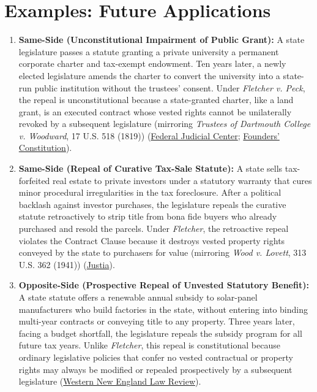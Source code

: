 \documentclass[12pt]{article}
\begin{document}
\section{Examples: Future Applications}

\begin{enumerate}
\item \textbf{Same-Side (Unconstitutional Impairment of Public Grant):} A state legislature passes a statute granting a private university a permanent corporate charter and tax-exempt endowment. Ten years later, a newly elected legislature amends the charter to convert the university into a state-run public institution without the trustees' consent. Under \textit{Fletcher v. Peck}, the repeal is unconstitutional because a state-granted charter, like a land grant, is an executed contract whose vested rights cannot be unilaterally revoked by a subsequent legislature (mirroring \textit{Trustees of Dartmouth College v. Woodward}, 17 U.S. 518 (1819)) (\href{https://www.fjc.gov/history/cases/cases-that-shaped-the-federal-courts/fletcher-v-peck}{Federal Judicial Center}; \href{https://press-pubs.uchicago.edu/founders/documents/a1_10_1s17.html}{Founders' Constitution}).

\item \textbf{Same-Side (Repeal of Curative Tax-Sale Statute):} A state sells tax-forfeited real estate to private investors under a statutory warranty that cures minor procedural irregularities in the tax foreclosure. After a political backlash against investor purchases, the legislature repeals the curative statute retroactively to strip title from bona fide buyers who already purchased and resold the parcels. Under \textit{Fletcher}, the retroactive repeal violates the Contract Clause because it destroys vested property rights conveyed by the state to purchasers for value (mirroring \textit{Wood v. Lovett}, 313 U.S. 362 (1941)) (\href{https://supreme.justia.com/cases/federal/us/313/362/}{Justia}).

\item \textbf{Opposite-Side (Prospective Repeal of Unvested Statutory Benefit):} A state statute offers a renewable annual subsidy to solar-panel manufacturers who build factories in the state, without entering into binding multi-year contracts or conveying title to any property. Three years later, facing a budget shortfall, the legislature repeals the subsidy program for all future tax years. Unlike \textit{Fletcher}, this repeal is constitutional because ordinary legislative policies that confer no vested contractual or property rights may always be modified or repealed prospectively by a subsequent legislature (\href{https://digitalcommons.wne.edu/cgi/viewcontent.cgi?article=1919&context=lawreview}{Western New England Law Review}).


\end{enumerate}
\end{document}
